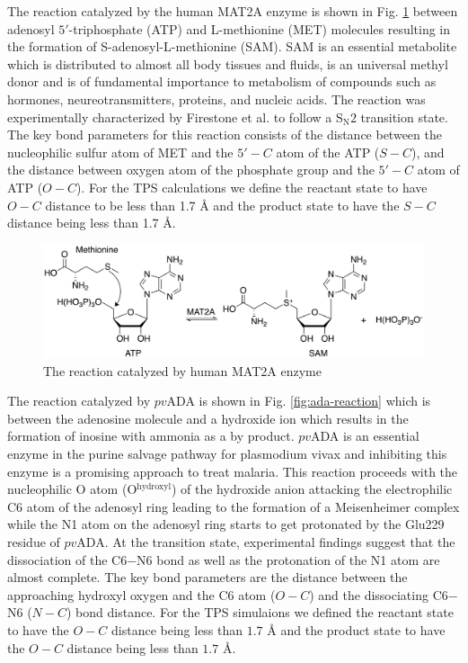 \documentclass[journal=jpcbfk,manuscript=article,layout=traditional]{achemso}
\begin{document}
The reaction catalyzed by the human MAT2A enzyme is shown in Fig. \ref{fig:mat2a-reaction}
between adenosyl $5'$-triphosphate (ATP) and L-methionine (MET) molecules resulting in the formation of
S-adenosyl-L-methionine (SAM). SAM is an essential metabolite which is distributed to almost all 
body tissues and fluids, is an universal methyl donor and is of
fundamental importance to metabolism of compounds such as hormones, neureotransmitters, proteins, 
and nucleic acids. \cite{Friedel89Drugs38p389} The reaction was experimentally characterized by 
Firestone et al. \cite{Firestone17JAmChemSoc139p13754} to follow a S$_{\text{N}}2$ transition 
state. The key bond parameters for this reaction consists of the distance between the
nucleophilic sulfur atom of MET and the $5'-C$ atom of the ATP ($S-C$), and the distance between 
oxygen atom of the phosphate group and the $5'-C$ atom of ATP ($O-C$).
For the TPS calculations we define the reactant state to have $O-C$ distance to be 
less than 1.7 {\AA} and the product state to have the $S-C$ distance being less than 1.7 {\AA}. 

\begin{figure}
\includegraphics[scale=0.6]{figures/mat2a-reaction.png}
\caption{The reaction catalyzed by human MAT2A enzyme}
\label{fig:mat2a-reaction}
\end{figure}

The reaction catalyzed by $pv$ADA is shown in  
Fig. \ref{fig:ada-reaction} which is between the adenosine molecule and a hydroxide ion
which results in the formation of inosine with ammonia as a by product. 
$pv$ADA is an essential enzyme in the purine salvage pathway for plasmodium vivax and 
inhibiting this enzyme is a promising approach to treat malaria. \cite{Madrid08JBiolChem283p35899}  
This reaction proceeds with the nucleophilic O atom (O$^{\text{hydroxyl}}$) of the hydroxide anion
attacking the electrophilic C6 atom of the adenosyl ring leading to the formation of a Meisenheimer 
complex while the N1 atom on the adenosyl ring starts to get 
protonated by the Glu229 residue of $pv$ADA. At the transition state, experimental findings 
suggest that the dissociation of the C6$-$N6 bond as well as the protonation of the N1 
atom are almost complete. \cite{Luo07JAmChemSoc129p8008} The key bond parameters are 
the distance between the approaching hydroxyl oxygen and the C6 atom ($O-C$) and the 
dissociating C6$-$N6 ($N-C$) bond distance. For the TPS simulaions we defined the reactant state to 
have the $O-C$ distance being less than $1.7$ {\AA} and the product state to have the $O-C$ 
distance being less than $1.7$ {\AA}.
\end{document}
